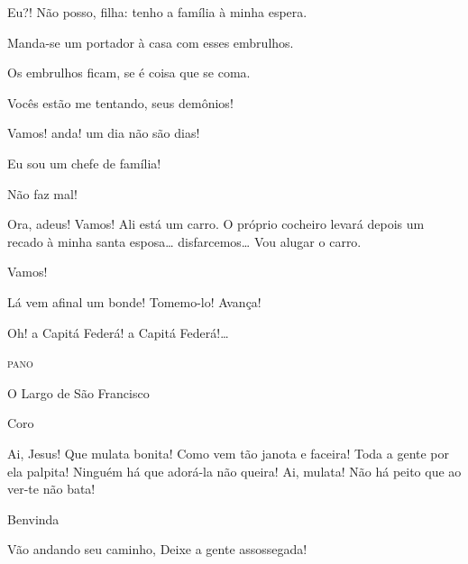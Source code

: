  Eu?! Não posso, filha: tenho a família à minha espera.

 Manda-se um portador à casa com esses embrulhos.

 Os embrulhos ficam, se é coisa que se coma.

 Vocês estão me tentando, seus demônios!

 Vamos! anda! um dia não são dias!

 Eu sou um chefe de família!

 Não faz mal!

 Ora, adeus! Vamos!  Ali está um
carro. O próprio cocheiro levará depois um recado à minha santa esposa\ldots{}
disfarcemos\ldots{} Vou alugar o carro. 

 Vamos! 

 Lá vem afinal um bonde! Tomemo-lo! Avança! 



 Oh! a Capitá Federá! a Capitá Federá!\ldots{}

\begin{center}
\textsc{pano}
\end{center}

\newact


O Largo de São Francisco



 Coro

 Ai, Jesus! Que mulata bonita!
 Como vem tão janota e faceira!
 Toda a gente por ela palpita!
 Ninguém há que adorá-la não queira!
 Ai, mulata!
 Não há peito que ao ver-te não bata!

 Benvinda

 Vão andando seu caminho,
 Deixe a gente assossegada!

